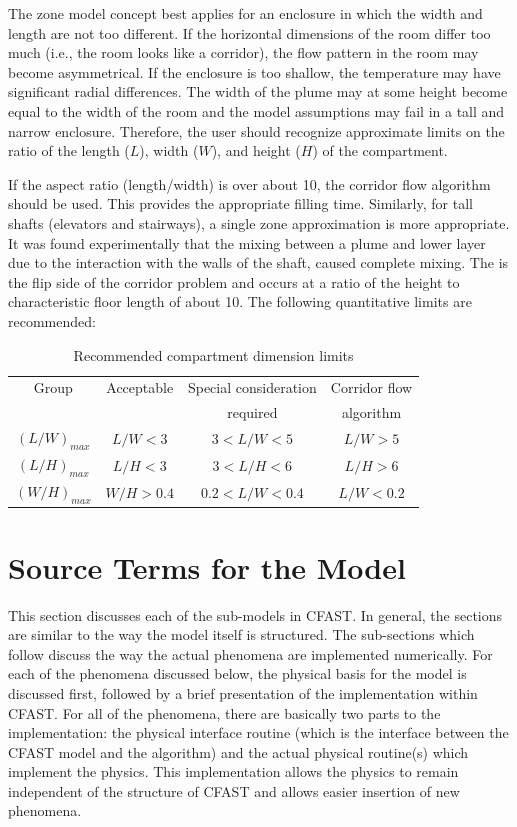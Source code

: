 The zone model concept best applies for an enclosure in which the width and length are not too
different. If the horizontal dimensions of the room differ too much (i.e., the room looks like a
corridor), the flow pattern in the room may become asymmetrical. If the enclosure is too
shallow, the temperature may have significant radial differences. The width of the plume may at
some height become equal to the width of the room and the model assumptions may fail in a tall
and narrow enclosure. Therefore, the user should recognize approximate limits on the ratio of the
length ($L$), width ($W$), and height ($H$) of the compartment.

If the aspect ratio (length/width) is over about 10, the corridor flow algorithm should be used.
This provides the appropriate filling time. Similarly, for tall shafts (elevators and stairways), a
single zone approximation is more appropriate. It was found experimentally \cite{Klote:1990} that the mixing
between a plume and lower layer due to the interaction with the walls of the shaft, caused
complete mixing. The is the flip side of the corridor problem and occurs at a ratio of the height
to characteristic floor length of about 10. The following quantitative limits are recommended:

\begin{table}[h]
\begin{center}
\caption{Recommended compartment dimension limits}
\label{tab:compartment_limits}
\vspace{0.1in}
\begin{tabular}{|c|c|c|c|}
\hline
Group & Acceptable & Special consideration & Corridor flow \\ 
 & & required & algorithm \\ \hline
$(L/W)_{max}$ & $L/W < 3$ & $3 < L/W < 5$ & $L/W > 5$ \\ \hline
$(L/H)_{max}$ &  $L/H < 3$ & $3 < L/H < 6$ & $L/H > 6$ \\ \hline
 $(W/H)_{max}$ & $W/H > 0.4$ & $0.2 < L/W < 0.4$ & $L/W < 0.2$ \\ \hline
\end{tabular}  
\end{center}
\end{table}

\section{Source Terms for the Model}

This section discusses each of the sub-models in CFAST. In general, the sections are similar to
the way the model itself is structured. The sub-sections which follow discuss the way the actual
phenomena are implemented numerically. For each of the phenomena discussed below, the
physical basis for the model is discussed first, followed by a brief presentation of the
implementation within CFAST. For all of the phenomena, there are basically two parts to the
implementation: the physical interface routine (which is the interface between the CFAST
model and the algorithm) and the actual physical routine(s) which implement the physics. This
implementation allows the physics to remain independent of the structure of CFAST and allows
easier insertion of new phenomena.

